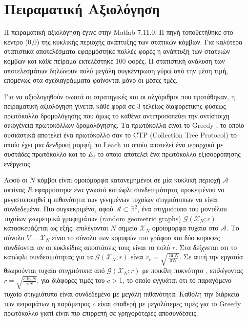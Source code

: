 

\chapter{Πειραματική Αξιολόγηση}\label{ch:results}
Η πειραματική αξιολόγηση έγινε στην Matlab 7.11.0. Η πηγή τοποθετήθηκε στο κέντρο (0,0) της κυκλικής περιοχής ανάπτυξης των στατικών κόμβων. Για καλύτερα στατιστικά
αποτελέσματα εφαρμόστηκε πολλές φορές η ανάπτυξη των στατικών κόμβων και κάθε πείραμα εκτελέστηκε 100 φορές. Η στατιστική ανάλυση των αποτελεσμάτων δηλώνουν
πολύ μεγάλη συγκέντρωση γύρω από την μέση τιμή, επομένως στα σχεδιαγράμματα φαίνονται μόνο οι μέσες τμές.

Για να αξιολογηθούν σωστά οι στρατηγικές και οι αλγόριθμοι που προτάθηκαν, η πειραματική αξιολόγηση γίνεται κάθε φορά σε 3 τελείως διαφορετικής φύσεως πρωτόκολλα
δρομολόγησης που όμως το καθένα αντιπροσοπεύει την αντίστοιχη οικογένεια πρωτοκόλλων δρομολόγησης. Τα πρωτόκολλα είναι το Greedy \cite{greedy_protocol}, το οποίο
ουσιαστικά αποτελεί ένα πρωτόκολλο σαν το CTP (Collection Tree Protocol) το οποίο έχει μια δενδρική μορφή, το Leach \cite{leach_protocol} το οποίο αποτελεί ένα
ιεραρχικό με συστάδες πρωτόκολλο και το $E_{i}$ \cite{debp_protocol} το οποίο αποτελεί ένα πρωτόκολλο εξισορρόπησης ενέργειας.

Αφού οι $N$ κόμβοι είναι ομοιόμορφα κατανεμημένοι σε μία κυκλική περιοχή $\mathcal{A}$ ακτίνας $R$ εφαρμόστηκε ένα γνωστό κατώφλι συνδεσιμότητας προκειμένου να
μεγιστοποιηθεί η πιθανότητα των γενημένων τυχαίων στιγμιότυπων να είναι συνδεδεμένα. Πιο συγκεκριμένα, αφού $\mathcal{A}\subset \mathbb{R}^2$, ένα στιγμιότυπο του
μοντέλου τυχαίων γεωμετρικά γραφημάτων (random geometric graphs) $\mathcal{G}(\mathcal{X}_N;r)$ κατασκευάζεται ως εξής: επιλέγονται $N$ σημεία $\mathcal{X}_N$
ομοίομορφα τυχαία στο $\mathcal{A}$. Το σύνολο $V = \mathcal{X}_N$  είναι το σύνολο των κορυφών του γράφου και δύο κορυφές συνδέονται αν οι ευκλείδιες αποστάσεις
τους είναι το πολύ $r$. Στα \cite{rg1,rg2} δείχνεται οτι το κατώφλι συνδεσιμότητας για τα $\mathcal{G}(\mathcal{X}_N;r)$ είναι $r_c = \sqrt{\frac{\ln N}{\pi N}}$. Σε
αυτή την εργασία θεωρούνται τυχαία στιγμιότυπα από $\mathcal{G}(\mathcal{X}_N;r)$ με ποικίλη πυκνότητα , επιλέγοντας $r = \sqrt{\frac{c\ln N}{\pi N}}$, για διάφορες
τιμές του $c>1$, το οποίο εγγυάται οτι το παραγόμενο τυχαίο στιγμιότυπο είναι συνδεδεμένο με μεγάλη πιθανότητα. Καθόλη την διάρκεια των πειραμάτων η παράμετρος $c$
είναι σταθερή με μεγαλύτερες τιμές για το Greedy πρωτόκολλο γιατί είναι πιο επιρρεπή σε γρηγορότερες αποσυνδέσεις.

